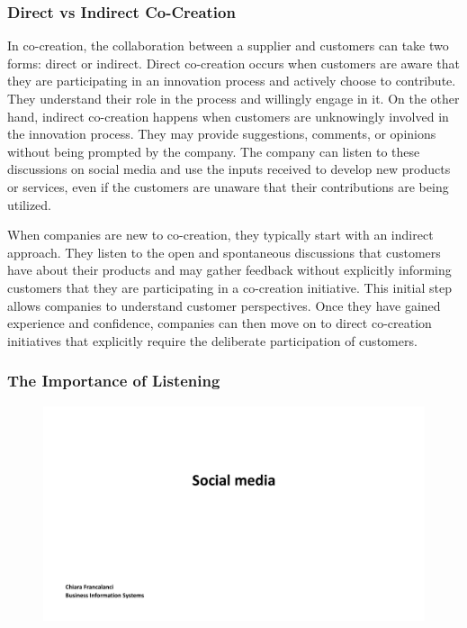 \subsubsection{Direct vs Indirect
    Co-Creation}\label{direct-vs-indirect-co-creation}

In co-creation, the collaboration between a supplier and customers can
take two forms: direct or indirect. Direct co-creation occurs when
customers are aware that they are participating in an innovation process
and actively choose to contribute. They understand their role in the
process and willingly engage in it. On the other hand, indirect
co-creation happens when customers are unknowingly involved in the
innovation process. They may provide suggestions, comments, or opinions
without being prompted by the company. The company can listen to these
discussions on social media and use the inputs received to develop new
products or services, even if the customers are unaware that their
contributions are being utilized.

When companies are new to co-creation, they typically start with an
indirect approach. They listen to the open and spontaneous discussions
that customers have about their products and may gather feedback without
explicitly informing customers that they are participating in a
co-creation initiative. This initial step allows companies to understand
customer perspectives. Once they have gained experience and confidence,
companies can then move on to direct co-creation initiatives that
explicitly require the deliberate participation of customers.

\subsubsection{The Importance of
    Listening}\label{the-importance-of-listening}

\begin{figure}[!h]
    \centering
    \includegraphics[page=12, trim = 1.5cm 7cm 2.5cm 4cm, clip, width=\textwidth]{images/04 - Social_Media.pdf}
\end{figure}

